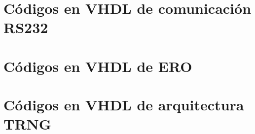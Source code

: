 

\newpage


\newpage



\newpage
	\section{Códigos en VHDL de comunicación RS232}


\newpage




\newpage




\newpage


	\section{Códigos en VHDL de ERO}


\newpage
	\section{Códigos en VHDL de arquitectura TRNG}




\newpage


\newpage

